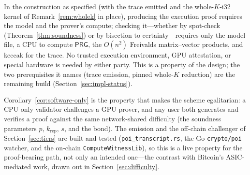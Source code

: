 \begin{corollary}
\label{cor:software-only}
In the construction as specified (with the trace emitted and the whole-$K$-i32 kernel of
Remark~\ref{rem:wholek} in place), producing the execution proof requires the model and
the prover's compute; checking
it---whether by spot-check (Theorem~\ref{thm:soundness}) or by bisection to
certainty---requires only the model file, a CPU to compute $\mathsf{PRG}$, the
$O(n^2)$ Freivalds matrix--vector products, and keccak for the trace. No trusted
execution environment, GPU attestation, or special hardware is needed by either
party. This is a property of the design; the two prerequisites it names (trace emission,
pinned whole-$K$ reduction) are the remaining build (Section~\ref{sec:impl-status}).
\end{corollary}

Corollary~\ref{cor:software-only} is the property that makes the scheme egalitarian: a
CPU-only validator challenges a GPU prover, and any user both generates and verifies a
proof against the same network-shared difficulty (the soundness parameters $p$,
$k_{\mathrm{rep}}$, $s$, and the bond). The emission and the off-chain challenger of
Section~\ref{sec:tiers} are built and tested (\texttt{poi\_transcript.rs}, the Go
\texttt{crypto/poi} watcher, and the on-chain \texttt{ComputeWitnessLib}), so this is a
live property for the proof-bearing path, not only an intended one---the contrast with
Bitcoin's ASIC-mediated work, drawn out in Section~\ref{sec:difficulty}.
